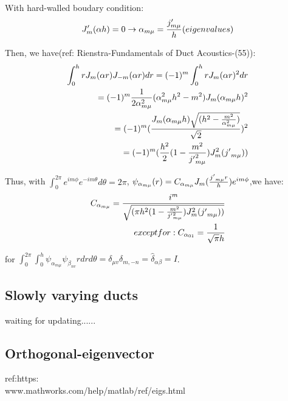 \documentclass{Note}
\begin{document}
With hard-walled boudary condition:
\begin{equation}
\begin{aligned}
J_m'(\alpha h)=0 \rightarrow \alpha_{m\mu}={{j'_{m\mu}}\over h} (eigenvalues)
\end{aligned}
\end{equation}

Then, we have(ref: Rienstra-Fundamentals of Duct Acoustics-(55)):
\begin{equation}
\begin{aligned}
\int_0^h  r J_m(\alpha r)  J_{-m}(\alpha r)dr=(-1)^m\int_0^h  r J_m(\alpha r)^2 dr\\
=(-1)^m 
{1\over 2\alpha_{m\mu}^2}(\alpha_{m\mu}^2h^2-m^2)J_m(\alpha_{m\mu} h)^2\\
=(-1)^m 
({J_m(\alpha_{m\mu} h)\sqrt{(h^2-{m^2\over \alpha_{m\mu}^2} )}\over \sqrt{2}})^2\\
=(-1)^m 
({{h^2\over 2}(1-{m^2\over {j'}_{m\mu}^2} )}J^2_m({j'}_{m\mu}))\\
\end{aligned}
\end{equation}

Thus, with $\int_0^{2\pi} e^{im\phi}e^{-im\theta}  d\theta=2\pi$,
$\psi_{\alpha_{m\mu}}(r)=C_{\alpha_{m\mu}}J_m({{j'}_{m\mu} r\over h})e^{im\phi}$,we have:
\begin{equation}
\begin{aligned}
C_{\alpha_{m\mu}}={i^m\over \sqrt{({{\pi h^2}(1-{m^2\over {j'}_{m\mu}^2} )}J^2_m({j'}_{m\mu}))}}\\
except for:
C_{\alpha_{01}}={1 \over \sqrt{\pi}h}
\end{aligned}
\end{equation}

for 
 $\int_0^{2\pi}\int_0^h \psi_{\alpha_{m\mu}} \psi_{\beta_{nv}} r dr d\theta=\delta_{\mu v} \delta_{m,-n} =\widehat{\delta }_{\alpha\beta}=I$.


\subsection{Slowly varying ducts}

waiting for updating......

\subsection{Orthogonal-eigenvector}
 ref:https:\\www.mathworks.com/help/matlab/ref/eigs.html
 
\end{document}
